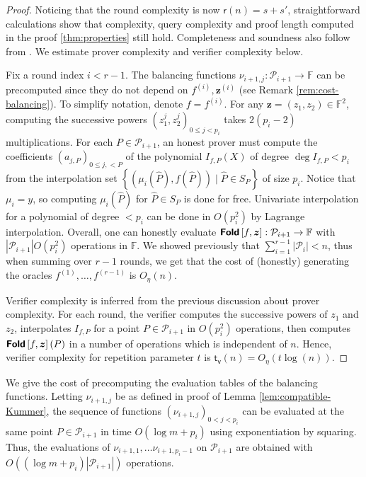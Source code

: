 \documentclass[a4paper,USenglish,autoref]{lipics-v2021}
\renewcommand\hat{\widehat}
\newcommand\F{\mathbb{F}}
\newcommand\fold[1]{\textsf{\textbf{Fold}}\left[#1\right]}
\renewcommand{\hat}{\widehat}
\renewcommand{\vec}[1]{\boldsymbol{#1}}
\newcommand{\set}[1]{\left\{#1\right\}}
\newcommand{\size}[1]{\left|#1\right|}
\newcommand\bfz{{\vec{z}}}
\newcommand\calP{\mathcal{P}}
\newcommand\xpi[1]{#1^{(i)}}
\begin{document}
\begin{proof}   
	Noticing that the round complexity is now $\mathsf{r}(n) = s + s'$, straightforward calculations show that complexity, query complexity and proof length computed in the proof \ref{thm:properties} still hold. Completeness and soundness also follow from \cite{ABN21}.
	We estimate prover complexity and verifier complexity below.
	
	Fix a round index $i < r - 1$. The balancing functions $\nu_{i+1, j} : \calP_{i+1} \rightarrow \F$ can be precomputed since they do not depend on $f^{(i)}, \bfz^{(i)}$ (see Remark \ref{rem:cost-balancing}).       
	To simplify notation, denote $f = \xpi{f}$. For any $\bfz = (z_1, z_2) \in \F^2$, computing the successive powers $(z_1^j, z_2^j)_{0 \le j < p_i}$ takes $2(p_i - 2)$ multiplications.         
	For each $P \in \calP_{i+1}$, an honest prover must compute the coefficients $(a_{j,P})_{0 \le j, < P}$ of the polynomial $I_{f, P}(X)$ of degree $\deg I_{f,P} < p_i$ from the interpolation set $\set{(\mu_i(\hat P), f(\hat P)) \mid \hat P \in S_{P}}$ of size $p_i$. Notice that $\mu_i = y$, so computing $\mu_i(\hat P)$ for $\hat P \in S_P$ is done for free. Univariate interpolation for a polynomial of degree $<p_i$ can be done in $O(p_i^2)$ by Lagrange interpolation.    
	Overall, one can honestly evaluate $\fold{f, \bfz} : \calP_{i + 1} \rightarrow \F$ with $\size{\calP_{i+1}}O(p_i^2)$ operations in $\F$. We showed previously that $\sum_{i=1}^{r - 1}\size{\calP_i} < n$, thus when summing over $r - 1$ rounds, we get that the cost of (honestly) generating the oracles $f^{(1)}, \ldots, f^{(r - 1)}$ is $O_{\eta }(n)$.        
	
	
	Verifier complexity is inferred from the previous discussion about prover complexity. For each round, the verifier computes the successive powers of $z_1$ and $z_2$, interpolates $I_{f,P}$ for a point $P \in \calP_{i+1}$ in $O(p_i^2)$ operations, then computes $\fold{f, \bfz}(P)$ in a number of operations which is independent of $n$. Hence, verifier complexity for repetition parameter $t$ is $\mathsf{t_v}(n) = O_{\eta}(t\log(n))$.   
\end{proof}

\begin{remark}\label{rem:cost-balancing}
	We give the cost of precomputing the evaluation tables of the balancing functions. Letting $\nu_{i+1, j}$ be as defined in proof of Lemma \ref{lem:compatible-Kummer}, the sequence of functions $(\nu_{i+1, j})_{0 < j < p_i}$ can be evaluated at the same point $P \in \calP_{i + 1}$ in time $O(\log m + p_i)$ using exponentiation by squaring. Thus, the evaluations of $\nu_{i+1, 1}, \dots \nu_{i+1, p_i - 1}$ on $\calP_{i+1}$ are obtained with $O((\log m + p_i)\size{\calP_{i+1}})$ operations.
\end{remark}
\end{document}
